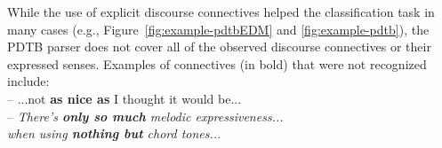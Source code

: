 \documentclass[letterpaper]{article}
\begin{document}



While the use of explicit discourse connectives helped the classification 
task in many cases (e.g., Figure~\ref{fig:example-pdtbEDM} and 
\ref{fig:example-pdtb}), the PDTB parser does not cover all of 
the observed discourse connectives or their expressed senses. Examples of 
connectives (in bold) that were not recognized include:\\

\indent -- ...not \textbf{as nice as} I thought it would be... \\
\indent -- \textit{ There's \textbf{only so much} melodic expressiveness...\\ 
\indent \hspace{3mm} when using \textbf{nothing but} chord tones...}\\
\end{document}
